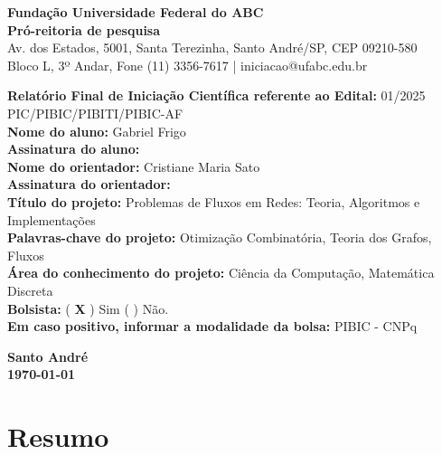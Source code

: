 \documentclass[12pt,a4paper]{article}
\begin{document}
\setlength{\emergencystretch}{3em}
\onehalfspacing

\begin{center}
    \textbf{Fundação Universidade Federal do ABC}\\
    \textbf{Pró-reitoria de pesquisa}\\
    \small Av. dos Estados, 5001, Santa Terezinha, Santo André/SP, CEP 09210-580\\
    Bloco L, 3º Andar, Fone (11) 3356-7617 | iniciacao@ufabc.edu.br
\end{center}

\vspace{0.8cm}

\noindent \textbf{Relatório Final de Iniciação Científica referente ao Edital:} 01/2025 PIC\slash PIBIC\slash PIBITI\slash PIBIC-AF \\[0.5cm]
\noindent \textbf{Nome do aluno:} Gabriel Frigo \\[0.5cm]
\noindent \textbf{Assinatura do aluno:} \hrulefill \\[0.5cm]
\noindent \textbf{Nome do orientador:} Cristiane Maria Sato \\[0.5cm]
\noindent \textbf{Assinatura do orientador:} \hrulefill \\[0.5cm]
\noindent \textbf{Título do projeto:} Problemas de Fluxos em Redes: Teoria, Algoritmos e Implementações \\[0.5cm]
\noindent \textbf{Palavras-chave do projeto:} Otimização Combinatória, Teoria dos Grafos, Fluxos \\[0.5cm]
\noindent \textbf{Área do conhecimento do projeto:} Ciência da Computação, Matemática Discreta \\[0.5cm]
\noindent \textbf{Bolsista:} ( \textbf{\textsf{X}} ) Sim \quad ( \quad ) Não. \\
\textbf{Em caso positivo, informar a modalidade da bolsa:} PIBIC - CNPq \\[1cm]

\begin{center}
    \textbf{Santo André}\\
    \textbf{\today}
\end{center}

\newpage
\renewcommand{\contentsname}{Sumário}
\tableofcontents
\newpage

\section{Resumo}
\end{document}
